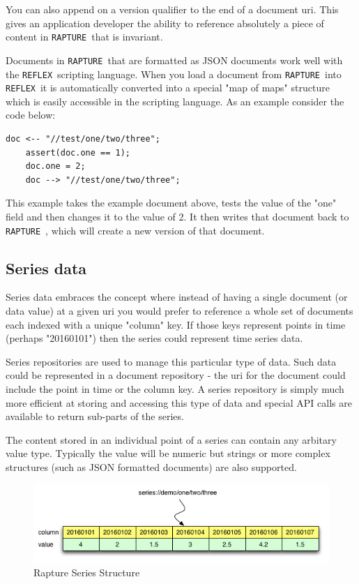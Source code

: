 \documentclass[12pt,twoside,a4paper]{book}
\newcommand{\Rapture}{\Verb+RAPTURE+~}
\newcommand{\Reflex}{\Verb+REFLEX+~}
\begin{document}
You can also append on a version qualifier to the end of a document uri. This gives an application
developer the ability to reference absolutely a piece of content in \Rapture that is invariant.

Documents in \Rapture that are formatted as JSON documents work well with the \Reflex scripting language. When
you load a document from \Rapture into \Reflex it is automatically converted into a special "map of maps" structure
which is easily accessible in the scripting language. As an example consider the code below:

\begin{lstlisting}[caption={Reflex document example}, language=reflex]
  doc <-- "//test/one/two/three";
	assert(doc.one == 1);
	doc.one = 2;
	doc --> "//test/one/two/three";
\end{lstlisting}

This example takes the example document above, tests the value of the "one" field and then
changes it to the value of 2. It then writes that document back to \Rapture, which will create a new
version of that document.

\subsection{Series data}

Series data embraces the concept where instead of having a single document (or data value) at a given
uri you would prefer to reference a whole set of documents each indexed with a unique "column" key. If those
keys represent points in time (perhaps "20160101") then the series could represent time series data.

Series repositories are used to manage this particular type of data. Such data could be represented in a document
repository - the uri for the document could include the point in time or the column key. A series repository is simply
much more efficient at storing and accessing this type of data and special API calls are available to return sub-parts of
the series.

The content stored in an individual point of a series can contain any arbitary value type. Typically the value will be
numeric but strings or more complex structures (such as JSON formatted documents) are also supported.

\begin{figure}[htb]
\centering
\includegraphics[scale=0.7]{Graphics/SeriesExplain}
\caption{Rapture Series Structure}
\label{fig:RaptureSeriesStructure}
\end{figure}
\end{document}
